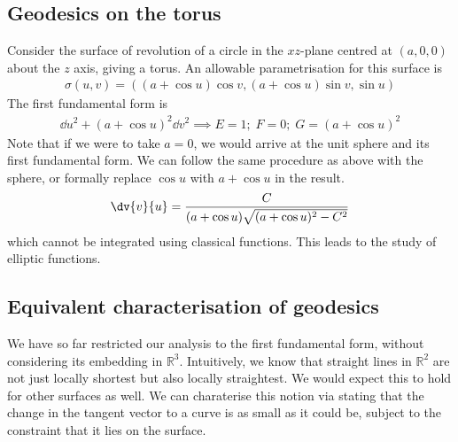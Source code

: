 \subsection{Geodesics on the torus}
Consider the surface of revolution of a circle in the $xz$-plane centred at $(a,0,0)$ about the $z$ axis, giving a torus.
An allowable parametrisation for this surface is
\begin{align*}
	\sigma(u,v) = ((a+\cos u)\cos v, (a+\cos u)\sin v, \sin u)
\end{align*}
The first fundamental form is
\begin{align*}
	\dd{u}^2 + (a+\cos u)^2 \dd{v}^2 \implies E = 1;\;F = 0;\;G = (a+\cos u)^2
\end{align*}
Note that if we were to take $a = 0$, we would arrive at the unit sphere and its first fundamental form.
We can follow the same procedure as above with the sphere, or formally replace $\cos u$ with $a+\cos u$ in the result.
\begin{align*}
	\dv{v}{u} = \frac{C}{(a+\cos u)\sqrt{(a+\cos u)^2 - C^2}}
\end{align*}
which cannot be integrated using classical functions.
This leads to the study of elliptic functions.

\subsection{Equivalent characterisation of geodesics}
We have so far restricted our analysis to the first fundamental form, without considering its embedding in $\mathbb R^3$.
Intuitively, we know that straight lines in $\mathbb R^2$ are not just locally shortest but also locally straightest.
We would expect this to hold for other surfaces as well.
We can charaterise this notion via stating that the change in the tangent vector to a curve is as small as it could be, subject to the constraint that it lies on the surface.

